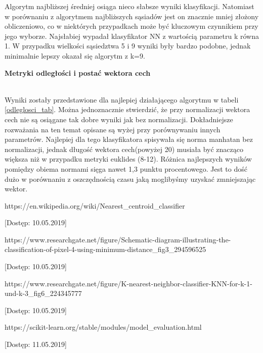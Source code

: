 \documentclass[12pt]{article}
\begin{document}
\indent Algorytm najbliższej średniej osiąga nieco słabsze wyniki klasyfikacji. Natomiast w porównaniu z algorytmem najbliższych sąsiadów jest on znacznie mniej złożony obliczeniowo, co w niektórych przypadkach może być kluczowym czynnikiem przy jego wyborze. Najsłabiej wypadał klasyfikator NN z wartością parametru k równa 1. W przypadku wielkości sąsiedztwa 5 i 9 wyniki były bardzo podobne, jednak minimalnie lepszy okazał się algorytm z k=9.\\
\centerline{\textbf{Metryki odległości i postać wektora cech}}\\
\indent Wyniki zostały przedstawione dla najlepiej działającego algorytmu w tabeli \ref{odleglosci_tab}. Można jednoznacznie stwierdzić, że przy normalizacji wektora cech nie są osiągane tak dobre wyniki jak bez normalizacji. Dokładniejsze rozważania na ten temat opisane są wyżej przy porównywaniu innych parametrów. Najlepiej dla tego klasyfikatora spisywała się norma manhatan bez normalizacji, jednak długość wektora cech(powyżej 20) musiała być znacząco większa niż w przypadku metryki euklides (8-12). Różnica najlepszych wyników pomiędzy obiema normami sięga nawet 1,3 punktu procentowego. Jest to dość dużo w porównaniu z oszczędnością czasu jaką moglibyśmy uzyskać zmniejszając wektor.

\newpage
\renewcommand\refname{Bibliografia}
\begin{thebibliography}{9}

  https://en.wikipedia.org/wiki/Nearest\_centroid\_classifier

[Dostęp: 10.05.2019]

  https://www.researchgate.net/figure/Schematic-diagram-illustrating-the-classification-of-pixel-4-using-minimum-distance\_fig3\_294596525

[Dostęp: 10.05.2019]

  https://www.researchgate.net/figure/K-nearest-neighbor-classifier-KNN-for-k-1-und-k-3\_fig6\_224345777

[Dostęp: 10.05.2019]

  https://scikit-learn.org/stable/modules/model\_evaluation.html

[Dostęp: 11.05.2019]

\end{thebibliography}
\end{document}
